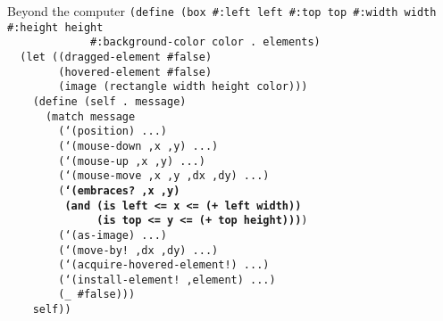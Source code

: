 \begin{frame}{Beyond the computer}
  \tiny
  \texttt{(define (box \#:left left \#:top top \#:width width \#:height height\\
    \ \ \ \ \ \ \ \ \ \ \ \ \ \#:background-color color .\ elements)\\
    \ \ (let ((dragged-element \#false)\\
    \ \ \ \ \ \ \ \ (hovered-element \#false)\\
    \ \ \ \ \ \ \ \ (image (rectangle width height color)))\\
    \ \ \ \ (define (self .\ message)\\
    \ \ \ \ \ \ (match message\\
    \ \ \ \ \ \ \ \ (`(position) ...)\\
    \ \ \ \ \ \ \ \ (`(mouse-down ,x ,y) ...)\\
    \ \ \ \ \ \ \ \ (`(mouse-up ,x ,y) ...)\\
    \ \ \ \ \ \ \ \ (`(mouse-move ,x ,y ,dx ,dy) ...)\\
    \ \ \ \ \ \ \ \ (\textbf{`(embraces?\ ,x ,y)\\
    \ \ \ \ \ \ \ \ \ (and (is left <= x <= (+ left width))\\
    \ \ \ \ \ \ \ \ \ \ \ \ \ \ (is top <= y <= (+ top height)))})\\
    \ \ \ \ \ \ \ \ (`(as-image) ...)\\
    \ \ \ \ \ \ \ \ (`(move-by!\ ,dx ,dy) ...)\\
    \ \ \ \ \ \ \ \ (`(acquire-hovered-element!) ...)\\
    \ \ \ \ \ \ \ \ (`(install-element!\ ,element) ...)\\
    \ \ \ \ \ \ \ \ (\_ \#false)))\\
    \ \ \ \ self))} \\
  \ \\ \ \\ \ \\ \ \\ \ \\ \ \\ \ \\ \ \\ \ 
\end{frame}

